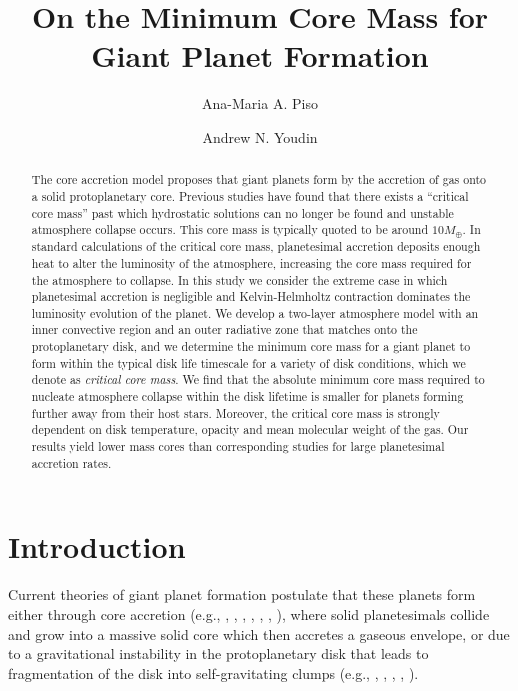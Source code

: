 \documentclass[apj]{emulateapj}
\begin{document}



\title{On the Minimum Core Mass for Giant Planet Formation}
\author{Ana-Maria A. Piso}
\author{Andrew N. Youdin}

\begin{abstract}
The core accretion model proposes that giant planets form by the accretion of gas onto a solid protoplanetary core. Previous studies have found that there exists a ``critical core mass'' past which hydrostatic solutions can no longer be found and unstable atmosphere collapse occurs. This core mass is typically quoted to be around $10 M_{\oplus}$. In standard calculations of the critical core mass, planetesimal accretion deposits enough heat to alter the luminosity of the atmosphere, increasing the core mass required for the atmosphere to collapse. In this study we consider the extreme case in which planetesimal accretion is negligible and Kelvin-Helmholtz contraction dominates the luminosity evolution of the planet. We develop a two-layer atmosphere model with an inner convective region and an outer radiative zone that matches onto the protoplanetary disk, and we determine the minimum core mass for a giant planet to form within the typical disk life timescale for a variety of disk conditions, which we denote as  \textit{critical core mass}.  We find that the absolute minimum core mass required to nucleate atmosphere collapse within the disk lifetime is smaller for planets forming further away from their host stars. Moreover, the critical core mass is strongly dependent on disk temperature, opacity and mean molecular weight of the gas. Our results yield lower mass cores than corresponding studies for large planetesimal accretion rates. %

\end{abstract}

\section{Introduction}
\label{intro}

Current theories of giant planet formation postulate that these planets form either through core accretion (e.g., \citealt{harris78}, \citealt{mizuno78}, \citealt{stevenson82}, \citealt{boden86}, \citealt{wuchterl93}, \citealt{pollack96}, \citealt{dangelo11}), where solid planetesimals collide and grow into a massive solid core which then accretes a gaseous envelope, or due to a gravitational instability in the protoplanetary disk that leads to fragmentation of the disk into self-gravitating clumps (e.g., \citealt{harris78}, \citealt{boss97}, \citealt{rafikov05}, \citealt{kratter10}, \citealt{dangelo11}).  %
\end{document}
